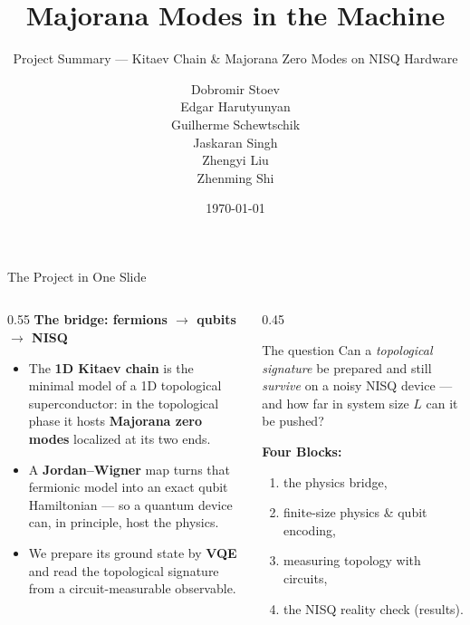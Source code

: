 \documentclass[aspectratio=169,12pt]{beamer}
\title[Majorana Modes in the Machine]{Majorana Modes in the Machine}
\subtitle{Project Summary --- Kitaev Chain \& Majorana Zero Modes on NISQ Hardware}
\author{Dobromir Stoev\\ Edgar Harutyunyan\\ Guilherme Schewtschik\\ Jaskaran Singh\\ Zhengyi Liu\\ Zhenming Shi}
\institute{Advanced Seminar -- AI-Augmented Theoretical Physics}
\date{\today}
\begin{document}
\begin{frame}
  \titlepage
\end{frame}

\begin{frame}{The Project in One Slide}
  \begin{columns}[T]
    \begin{column}{0.55\textwidth}
      \small
      \textbf{The bridge: fermions $\to$ qubits $\to$ NISQ}
      \begin{itemize}
        \item The \textbf{1D Kitaev chain} is the minimal model of a 1D topological superconductor: in the topological phase it hosts \textbf{Majorana zero modes} localized at its two ends.
        \item A \textbf{Jordan--Wigner} map turns that fermionic model into an exact qubit Hamiltonian --- so a quantum device can, in principle, host the physics.
        \item We prepare its ground state by \textbf{VQE} and read the topological signature from a circuit-measurable observable.
      \end{itemize}
    \end{column}
    \begin{column}{0.45\textwidth}
      \small
      \begin{block}{The question}
        Can a \emph{topological signature} be prepared and still \emph{survive} on a noisy NISQ device --- and how far in system size $L$ can it be pushed?
      \end{block}
      \vspace{0.15cm}
      \footnotesize
      \textbf{Four Blocks:}
      \begin{enumerate}
        \item the physics bridge,
        \item finite-size physics \& qubit encoding,
        \item measuring topology with circuits,
        \item the NISQ reality check (results).
      \end{enumerate}
    \end{column}
  \end{columns}
\end{frame}
\end{document}
